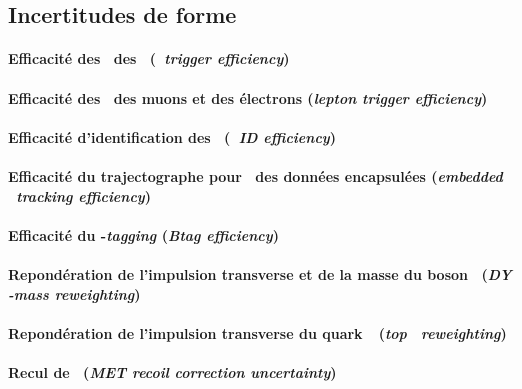 \subsection{Incertitudes de forme}\label{chapter-HTT_analysis-section-systematics-shapes}

\paragraph{Efficacité des \HLTpaths\ des \tauh\ (\emph{\tauh\ trigger efficiency})}

\paragraph{Efficacité des \HLTpaths\ des muons et des électrons (\emph{lepton trigger efficiency})}

\paragraph{Efficacité d'identification des \tauh\ (\emph{\tauh\ ID efficiency})}

\paragraph{Efficacité du trajectographe pour \tauh\ des données encapsulées (\emph{embedded \tauh\ tracking efficiency})}

\paragraph{Efficacité du \quarkb-\emph{tagging} (\emph{Btag efficiency})}

\paragraph{Repondération de l'impulsion transverse et de la masse du boson \Zboson\ (\emph{DY \pT-mass reweighting})}

\paragraph{Repondération de l'impulsion transverse du quark~\quarkt\ (\emph{top \pT\ reweighting})}

\paragraph{Recul de \MET\ (\emph{MET recoil correction uncertainty})}

